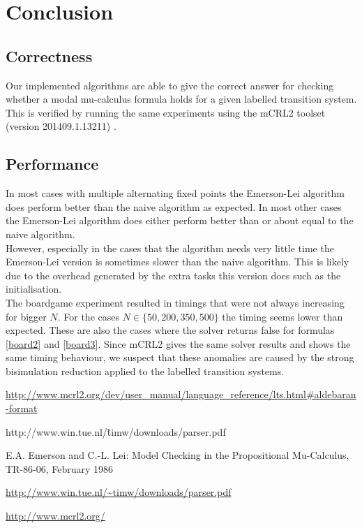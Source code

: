 \documentclass[10pt,a4paper]{article}
\begin{document}
\section{Conclusion}\label{conc}

\subsection{Correctness}
Our implemented algorithms are able to give the correct answer for checking whether a modal mu-calculus formula holds for a given labelled transition system. This is verified by running the same experiments using the mCRL2 toolset (version 201409.1.13211) \cite{mcrl2}.


\subsection{Performance}
In most cases with multiple alternating fixed points the Emerson-Lei algorithm does perform better than the naive algorithm as expected. In most other cases the Emerson-Lei algorithm does either perform better than or about equal to the naive algorithm.\\ However, especially in the cases that the algorithm needs very little time the Emerson-Lei version is sometimes slower than the naive algorithm. This is likely due to the overhead generated by the extra tasks this version does such as the initialisation.\\
The boardgame experiment resulted in timings that were not always increasing for bigger $N$. For the cases $N \in \{50, 200, 350, 500\}$ the timing seems lower than expected. These are also the cases where the solver returns false for formulas \ref{board2} and \ref{board3}. Since mCRL2 gives the same solver results and shows the same timing behaviour, we suspect that these anomalies are caused by the strong bisimulation reduction applied to the labelled transition systems.




\begin{thebibliography}{9}
	 \url{http://www.mcrl2.org/dev/user_manual/language_reference/lts.html#aldebaran-format}
	
	 http://www.win.tue.nl/\~timw/downloads/parser.pdf
	
	 E.A. Emerson and C.-L. Lei: Model Checking in the Propositional Mu-Calculus, TR-86-06, February 1986

	 \url{http://www.win.tue.nl/\~timw/downloads/parser.pdf}
	
	 \url{http://www.mcrl2.org/}
\end{thebibliography}
\end{document}
